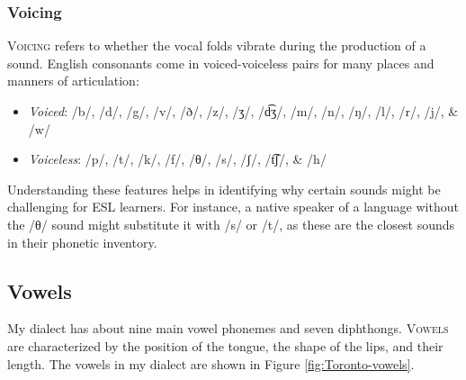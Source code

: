 \subsubsection{Voicing}

\textsc{Voicing} refers to whether the vocal folds vibrate during the production of a sound. English consonants come in voiced-voiceless pairs for many places and manners of articulation:

\begin{itemize}[noitemsep]
    \item \textit{Voiced}: /b/, /d/, /g/, /v/, /ð/, /z/, /ʒ/, /d͡ʒ/, /m/, /n/, /ŋ/, /l/, /r/, /j/, \& /w/
    \item \textit{Voiceless}: /p/, /t/, /k/, /f/, /θ/, /s/, /ʃ/, /t͡ʃ/, \& /h/
\end{itemize}

Understanding these features helps in identifying why certain sounds might be challenging for ESL learners. For instance, a native speaker of a language without the /θ/ sound might substitute it with /s/ or /t/, as these are the closest sounds in their phonetic inventory.

\subsection{Vowels}

My dialect has about nine main vowel phonemes and seven diphthongs. \textsc{Vowels} are characterized by the position of the tongue, the shape of the lips, and their length. The vowels in my dialect are shown in Figure \ref{fig:Toronto-vowels}.

